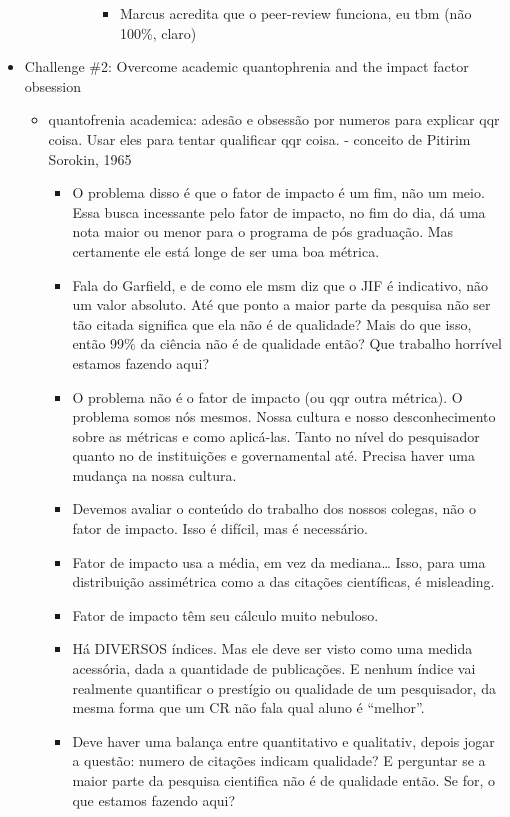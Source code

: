 \documentclass[11pt]{article}
\begin{document}
\begin{itemize}
\begin{itemize}
\begin{itemize}
\begin{itemize}
\begin{itemize}
\item Marcus acredita que o peer-review funciona, eu tbm (não 100\%, claro)
\end{itemize}
\end{itemize}
\end{itemize}
\end{itemize}
\item Challenge \#2: Overcome academic quantophrenia and the impact factor obsession
\begin{itemize}
\item quantofrenia academica: adesão e obsessão por numeros para explicar qqr coisa. Usar eles para tentar qualificar qqr coisa. - conceito de Pitirim Sorokin, 1965
\begin{itemize}
\item O problema disso é que o fator de impacto é um fim, não um meio. Essa busca incessante pelo fator de impacto, no fim do dia, dá uma nota maior ou menor para o programa de pós graduação. Mas certamente ele está longe de ser uma boa métrica.
\item Fala do Garfield, e de como ele msm diz que o JIF é indicativo, não um valor absoluto. Até que ponto a maior parte da pesquisa não ser tão citada significa que ela não é de qualidade? Mais do que isso, então 99\% da ciência não é de qualidade então? Que trabalho horrível estamos fazendo aqui?
\item O problema não é o fator de impacto (ou qqr outra métrica). O problema somos nós mesmos. Nossa cultura e nosso desconhecimento sobre as métricas e como aplicá-las. Tanto no nível do pesquisador quanto no de instituições e governamental até. Precisa haver uma mudança na nossa cultura.
\item Devemos avaliar o conteúdo do trabalho dos nossos colegas, não o fator de impacto. Isso é difícil, mas é necessário.
\item Fator de impacto usa a média, em vez da mediana\ldots{} Isso, para uma distribuição assimétrica como a das citações científicas, é misleading.
\item Fator de impacto têm seu cálculo muito nebuloso.
\item Há DIVERSOS índices. Mas ele deve ser visto como uma medida acessória, dada a quantidade de publicações. E nenhum índice vai realmente quantificar o prestígio ou qualidade de um pesquisador, da mesma forma que um CR não fala qual aluno é ``melhor''.
\item Deve haver uma balança entre quantitativo e qualitativ, depois jogar a questão: numero de citações indicam qualidade? E perguntar se a maior parte da pesquisa cientifica não é de qualidade então. Se for, o que estamos fazendo aqui?

\end{itemize}
\end{itemize}
\end{itemize}
\end{document}
